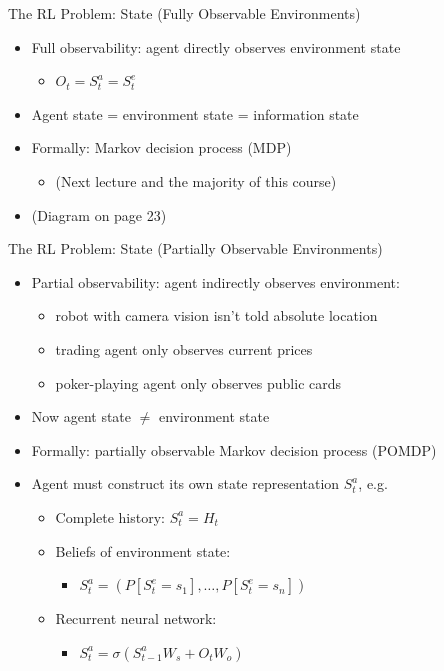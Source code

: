 \documentclass[presentation]{beamer}
\begin{document}
\begin{frame}[label={sec:orgd5e74d2}]{The RL Problem: State (Fully Observable Environments)}
\begin{itemize}
\item Full observability: agent directly observes environment state
\begin{itemize}
\item \(O_t = S^a_t = S^e_t\)
\end{itemize}
\item Agent state = environment state = information state
\item Formally: Markov decision process (MDP)
\begin{itemize}
\item (Next lecture and the majority of this course)
\end{itemize}
\item (Diagram on page 23)
\end{itemize}
\end{frame}
\begin{frame}[label={sec:org14f8903}]{The RL Problem: State (Partially Observable Environments)}
\begin{itemize}
\item Partial observability: agent indirectly observes environment:
\begin{itemize}
\item robot with camera vision isn’t told absolute location
\item trading agent only observes current prices
\item poker-playing agent only observes public cards
\end{itemize}
\item Now agent state \(\neq\) environment state
\item Formally: partially observable Markov decision process (POMDP)
\item Agent must construct its own state representation \(S^a_t\), e.g.
\begin{itemize}
\item Complete history: \(S^a_t = H_t\)
\item Beliefs of environment state:
\begin{itemize}
\item \(S^a_t = (P[S^e_t=s_1], \ldots, P[S^e_t=s_n])\)
\end{itemize}
\item Recurrent neural network:
\begin{itemize}
\item \(S^a_t = \sigma(S^a_{t-1} W_s + O_t W_o)\)
\end{itemize}
\end{itemize}
\end{itemize}
\end{frame}
\end{document}
